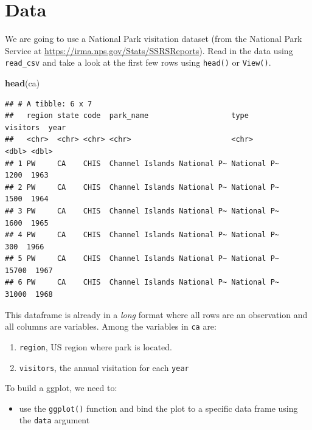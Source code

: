 \documentclass[]{book}
\newenvironment{Shaded}{\begin{snugshade}}{\end{snugshade}}
\newcommand{\KeywordTok}[1]{\textcolor[rgb]{0.13,0.29,0.53}{\textbf{#1}}}
\newcommand{\NormalTok}[1]{#1}
\providecommand{\tightlist}{%
  \setlength{\itemsep}{0pt}\setlength{\parskip}{0pt}}
\begin{document}
\hypertarget{data}{%
\section{Data}\label{data}}

We are going to use a National Park visitation dataset (from the National Park Service at \url{https://irma.nps.gov/Stats/SSRSReports}). Read in the data using \texttt{read\_csv} and take a look at the first few rows using \texttt{head()} or \texttt{View()}.

\begin{Shaded}
\begin{Highlighting}[]
\KeywordTok{head}\NormalTok{(ca)}
\end{Highlighting}
\end{Shaded}

\begin{verbatim}
## # A tibble: 6 x 7
##   region state code  park_name                   type        visitors  year
##   <chr>  <chr> <chr> <chr>                       <chr>          <dbl> <dbl>
## 1 PW     CA    CHIS  Channel Islands National P~ National P~     1200  1963
## 2 PW     CA    CHIS  Channel Islands National P~ National P~     1500  1964
## 3 PW     CA    CHIS  Channel Islands National P~ National P~     1600  1965
## 4 PW     CA    CHIS  Channel Islands National P~ National P~      300  1966
## 5 PW     CA    CHIS  Channel Islands National P~ National P~    15700  1967
## 6 PW     CA    CHIS  Channel Islands National P~ National P~    31000  1968
\end{verbatim}

This dataframe is already in a \emph{long} format where all rows are an observation and all columns are variables. Among the variables in \texttt{ca} are:

\begin{enumerate}
\def\labelenumi{\arabic{enumi}.}
\item
  \texttt{region}, US region where park is located.
\item
  \texttt{visitors}, the annual visitation for each \texttt{year}
\end{enumerate}

To build a ggplot, we need to:

\begin{itemize}
\tightlist
\item
  use the \texttt{ggplot()} function and bind the plot to a specific data frame using the \texttt{data} argument
\end{itemize}
\end{document}
